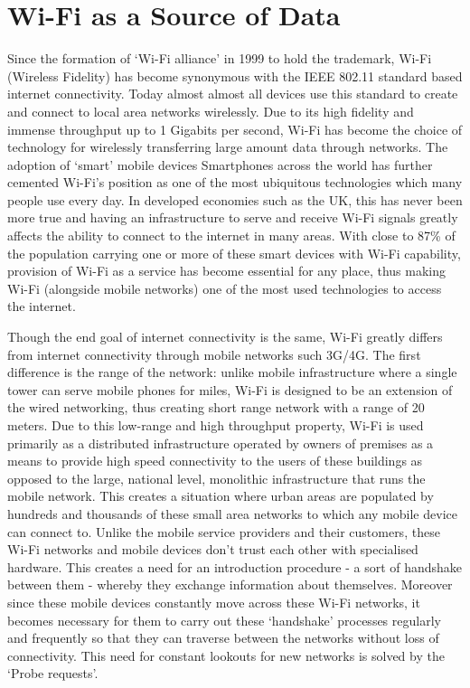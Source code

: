 \section{Wi-Fi as a Source of Data} \label{wifi-as-source-of-data}

Since the formation of `Wi-Fi alliance' in 1999 to hold the trademark, Wi-Fi (Wireless Fidelity) has become synonymous with the IEEE 802.11 standard based internet connectivity.
Today almost almost all devices use this standard to create and connect to local area networks wirelessly.
Due to its high fidelity and immense throughput up to 1 Gigabits per second, Wi-Fi has become the choice of technology for wirelessly transferring large amount data through networks.
The adoption of `smart' mobile devices Smartphones across the world has further cemented Wi-Fi's position as one of the most ubiquitous technologies which many people use every day.
In developed economies such as the UK, this has never been more true and having an infrastructure to serve and receive Wi-Fi signals greatly affects the ability to connect to the internet in many areas.
With close to 87\%\cite{deloitte2018} of the population carrying one or more of these smart devices with Wi-Fi capability, provision of Wi-Fi as a service has become essential for any place, thus making Wi-Fi (alongside mobile networks) one of the most used technologies to access the internet.

Though the end goal of internet connectivity is the same, Wi-Fi greatly differs from internet connectivity through mobile networks such 3G/4G.
The first difference is the range of the network: unlike mobile infrastructure where a single tower can serve mobile phones for miles, Wi-Fi is designed to be an extension of the wired networking, thus creating short range network with a range of 20 meters.
Due to this low-range and high throughput property, Wi-Fi is used primarily as a distributed infrastructure operated by owners of premises as a means to provide high speed connectivity to the users of these buildings as opposed to the large, national level, monolithic infrastructure that runs the mobile network.
This creates a situation where urban areas are populated by hundreds and thousands of these small area networks to which any mobile device can connect to.
Unlike the mobile service providers and their customers, these Wi-Fi networks and mobile devices don't trust each other with specialised hardware.
This creates a need for an introduction procedure - a sort of handshake between them - whereby they exchange information about themselves. 
Moreover since these mobile devices constantly move across these Wi-Fi networks, it becomes necessary for them to carry out these `handshake' processes regularly and frequently so that they can traverse between the networks without loss of connectivity.
This need for constant lookouts for new networks is solved by the `Probe requests'.

